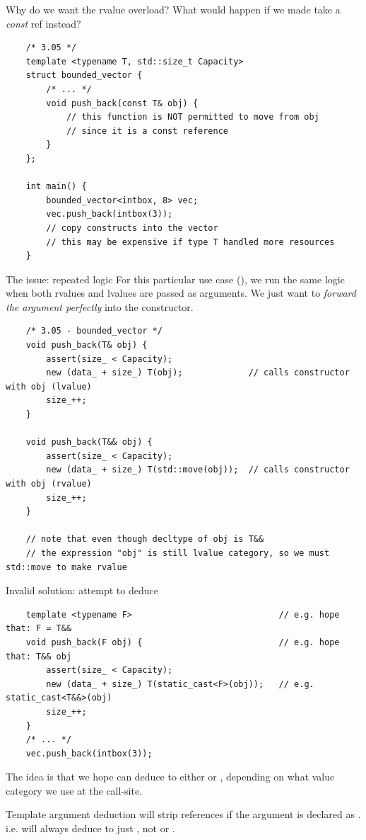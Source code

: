 \begin{frame}[fragile]{Why do we want the rvalue overload?}
  What would happen if we made  take a \emph{const} ref instead?
  \begin{verbatim}
    /* 3.05 */
    template <typename T, std::size_t Capacity>
    struct bounded_vector {
        /* ... */
        void push_back(const T& obj) {
            // this function is NOT permitted to move from obj
            // since it is a const reference
        }
    };

    int main() {
        bounded_vector<intbox, 8> vec;
        vec.push_back(intbox(3));
        // copy constructs into the vector
        // this may be expensive if type T handled more resources
    }
  \end{verbatim}
\end{frame}

\begin{frame}[fragile]{The issue: repeated logic}
  For this particular use case (), we run the same logic
  when both rvalues and lvalues are passed as arguments. 
  We just want to \emph{forward the argument perfectly} into the constructor.

  \begin{verbatim}
    /* 3.05 - bounded_vector */
    void push_back(T& obj) {
        assert(size_ < Capacity);
        new (data_ + size_) T(obj);             // calls constructor with obj (lvalue)
        size_++;
    }

    void push_back(T&& obj) {
        assert(size_ < Capacity);
        new (data_ + size_) T(std::move(obj));  // calls constructor with obj (rvalue)
        size_++;
    }

    // note that even though decltype of obj is T&&
    // the expression "obj" is still lvalue category, so we must std::move to make rvalue
  \end{verbatim}
\end{frame}

\begin{frame}[fragile]{Invalid solution: attempt to deduce }
  \begin{verbatim}
    template <typename F>                             // e.g. hope that: F = T&&
    void push_back(F obj) {                           // e.g. hope that: T&& obj
        assert(size_ < Capacity);
        new (data_ + size_) T(static_cast<F>(obj));   // e.g. static_cast<T&&>(obj)
        size_++;
    }
    /* ... */
    vec.push_back(intbox(3));
  \end{verbatim}

  The idea is that we hope  can deduce to either  or ,
  depending on what value category we use at the call-site.

  \begin{sqt:result}
    Template argument deduction will strip references if the argument is declared as .
    i.e.  will always deduce to just , not  or .
  \end{sqt:result}
\end{frame}

